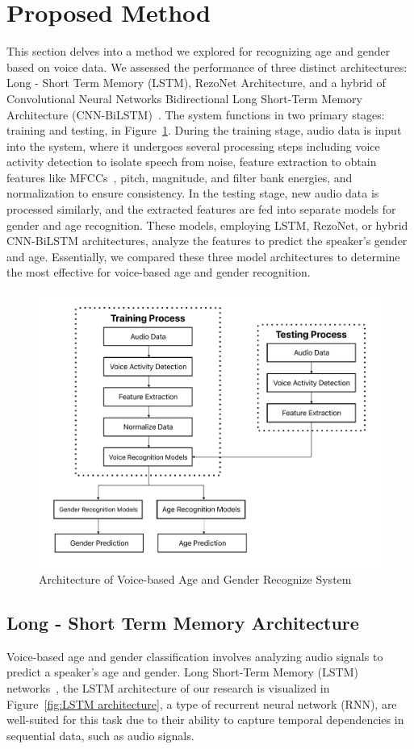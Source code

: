 \documentclass[conference, 10pt,onecolumn]{IEEEtran}
\begin{document}
\section{Proposed Method}

This section delves into a method we explored for recognizing age and gender based on voice data. We assessed the performance of three distinct architectures: Long - Short Term Memory (LSTM)\cite{riesmeier2022late}, RezoNet Architecture, and a hybrid of Convolutional Neural Networks Bidirectional Long Short-Term Memory Architecture (CNN-BiLSTM)~\cite{kattenborn2021review}. The system functions in two primary stages: training and testing, in Figure~\ref{fig:Research Architecture}. During the training stage, audio data is input into the system, where it undergoes several processing steps including voice activity detection to isolate speech from noise, feature extraction to obtain features like MFCCs~\cite{1163420}, pitch\cite{yang2016pitch}, magnitude\cite{torres2002approaches}, and filter bank energies, and normalization to ensure consistency. In the testing stage, new audio data is processed similarly, and the extracted features are fed into separate models for gender and age recognition. These models, employing LSTM, RezoNet, or hybrid CNN-BiLSTM architectures, analyze the features to predict the speaker's gender and age. Essentially, we compared these three model architectures to determine the most effective for voice-based age and gender recognition.

\begin{figure}
    \centering
    \includegraphics[width=3.5 in]{Research Architecture.pdf}
    \caption{Architecture of Voice-based Age and Gender Recognize System}
    \label{fig:Research Architecture}
\end{figure}

\subsection{Long - Short Term Memory Architecture}
Voice-based age and gender classification involves analyzing audio signals to predict a speaker's age and gender. Long Short-Term Memory (LSTM) networks~\cite{yu2019review}, the LSTM architecture of our research is visualized in Figure~\ref{fig:LSTM architecture}, a type of recurrent neural network (RNN), are well-suited for this task due to their ability to capture temporal dependencies in sequential data, such as audio signals.
\end{document}
